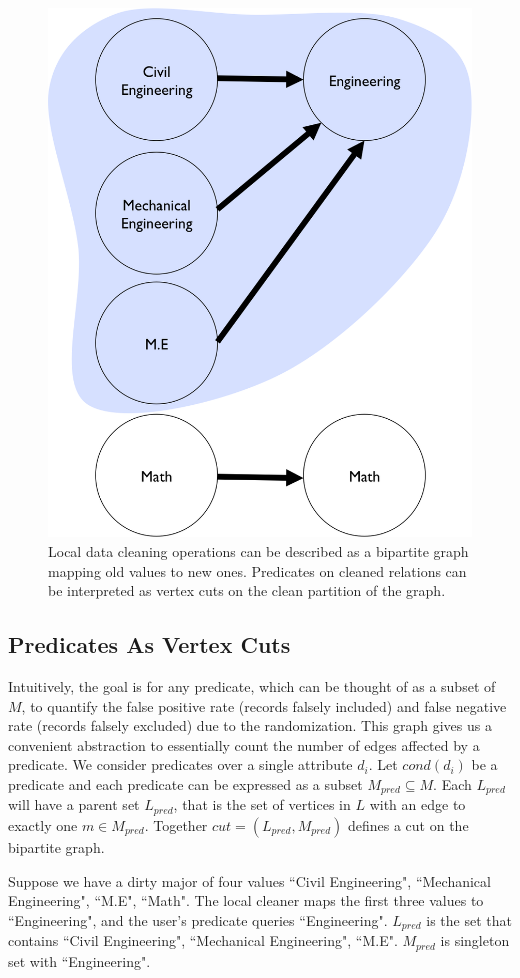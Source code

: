 \begin{figure}[t]
\centering
 \includegraphics[width=0.5\columnwidth]{figs/graph.png}
 \caption{Local data cleaning operations can be described as a bipartite graph mapping old values to new ones. Predicates on cleaned relations can be interpreted as vertex cuts on the clean partition of the graph.\label{architecture}}
\end{figure}

\subsection{Predicates As Vertex Cuts}
Intuitively, the goal is for any predicate, which can be thought of as a subset of $M$, to quantify the false positive rate (records falsely included) and false negative rate (records falsely excluded) due to the randomization. 
This graph gives us a convenient abstraction to essentially count the number of edges affected by a predicate.
We consider predicates over a single attribute $d_i$.
Let $cond(d_i)$ be a predicate and each predicate can be expressed as a subset $M_{pred} \subseteq M$.
Each $L_{pred}$ will have a parent set $L_{pred}$, that is the set of vertices in $L$ with an edge to exactly one $m \in M_{pred}$.
Together $cut = (L_{pred},M_{pred})$ defines a cut on the bipartite graph.

\begin{example}
Suppose we have a dirty \textsf{major} of four values ``Civil Engineering", ``Mechanical Engineering", ``M.E", ``Math".
The local cleaner maps the first three values to ``Engineering", and the user's predicate queries ``Engineering".
$L_{pred}$ is the set that contains ``Civil Engineering", ``Mechanical Engineering", ``M.E".
$M_{pred}$ is singleton set with ``Engineering".
\end{example}

